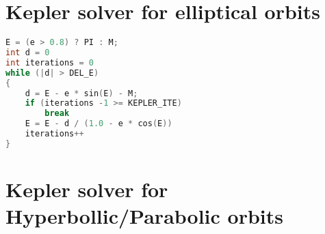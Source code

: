 \section{Kepler solver for elliptical orbits}
\label{ap:kepler-elliptical}
\begin{lstlisting}[language=C]
E = (e > 0.8) ? PI : M;
int d = 0
int iterations = 0
while (|d| > DEL_E)
{
    d = E - e * sin(E) - M;
    if (iterations -1 >= KEPLER_ITE)
        break
    E = E - d / (1.0 - e * cos(E))
    iterations++
}
\end{lstlisting}


\section{Kepler solver for Hyperbollic/Parabolic orbits}
\label{ap:kepler-hyperbollic}

